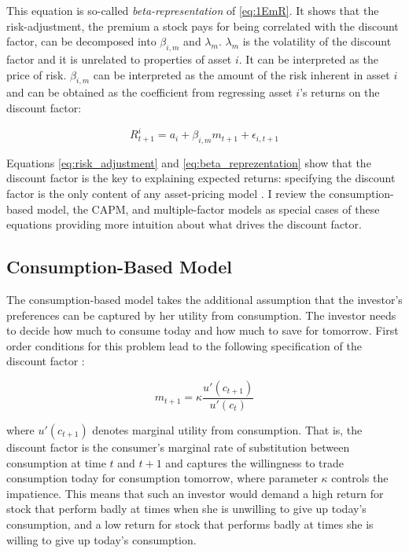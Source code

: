  		This equation is so-called \textit{beta-representation} of \ref{eq:1EmR}. It shows that the risk-adjustment, the premium a stock pays for being correlated with the discount factor, can be decomposed into $\beta_{i,m}$ and $\lambda_m$. $\lambda_m$ is the volatility of the discount factor and it is unrelated to properties of asset $i$. It can be interpreted as the price of risk. $\beta_{i,m}$ can be interpreted as the amount of the risk inherent in asset $i$ and can be obtained as the coefficient from regressing asset $i$'s returns on the discount factor: 
 		
 		\begin{equation}
 		R_{t+1}^i = a_i + \beta_{i,m}m_{t+1} + \epsilon_{i,t+1}
 		\end{equation} 
 		
 		Equations \ref{eq:risk_adjustment} and \ref{eq:beta_reprezentation} show that the discount factor is the key to explaining expected returns: specifying the discount factor is the only content of any asset-pricing model \cite{cochrane2009asset}. I review the consumption-based model, the CAPM, and multiple-factor models as special cases of these equations providing more intuition about what drives the discount factor. 
 			 	
	 	\subsection{Consumption-Based Model}
	 	
		 	The consumption-based model takes the additional assumption that the investor's preferences can be captured by her utility from consumption. The investor needs to decide how much to consume today and how much to save for tomorrow. First order conditions for this problem lead to the following specification of the discount factor \cite{cochrane2009asset}: 
		 	
		 	\begin{equation}
		 		m_{t+1} = \kappa \frac{u'(c_{t+1})}{u'(c_t)} \label{consumtion_based_model}
		 	\end{equation}
		 	
		 	where $u'(c_{t+1})$ denotes marginal utility from consumption. That is, the discount factor is the consumer's  marginal rate of substitution between consumption at time $t$ and $t+1$ and captures the willingness to trade consumption today for consumption tomorrow, where parameter $\kappa$ controls the impatience. This means that such an investor would demand a high return for stock that perform badly at times when she is unwilling to give up today's consumption, and a low return for stock that performs badly at times she is willing to give up today's consumption. 
		 	
